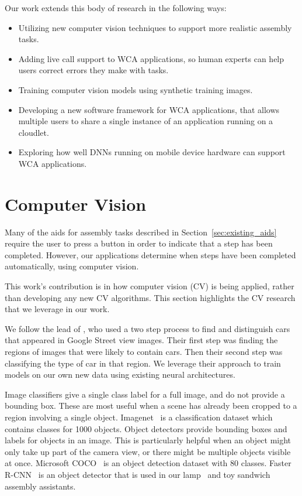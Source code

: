 Our work extends this body of research in the following ways:
\begin{itemize}
\item Utilizing new computer vision techniques to support more realistic
  assembly tasks.
\item Adding live call support to WCA applications, so human experts can help
  users correct errors they make with tasks.
\item Training computer vision models using synthetic training images.
\item Developing a new software framework for WCA applications, that allows
  multiple users to share a single instance of an application running on a
  cloudlet.
\item Exploring how well DNNs running on mobile device hardware can support
  WCA applications.
\end{itemize}

\section{Computer Vision}

Many of the aids for assembly tasks described in Section~\ref{sec:existing_aids}
require the user to press a button in order to indicate that a step has been
completed.
However, our applications determine when steps have been completed
automatically, using computer vision.

This work's contribution is in how computer vision (CV) is being applied, rather
than developing any new CV algorithms.
This section highlights the CV research that we leverage in our work.

We follow the lead of \citet{gebru2017finegrained}, who used a two step
process to find and distinguish cars that appeared in Google Street view
images.
Their first step was finding the
regions of images that were likely to contain cars. Then their second step was
classifying the type of car in that region.
We leverage their approach to train models on our own new
data using existing neural architectures.

Image classifiers give a single class label for a full image, and do not provide
a bounding box. These are most useful when a scene has already been cropped to a
region involving a single object. Imagenet~\cite{ImageNet_VSS09} is a
classification dataset which contains classes for 1000 objects. Object
detectors provide bounding boxes and labels for objects in an image. This is
particularly helpful
when an object might only take up part of the camera view, or there might be
multiple objects visible
at once. Microsoft COCO~\cite{coco} is an object detection dataset with 80
classes.
Faster R-CNN~\cite{frcnn} is an object detector that is used in our
lamp~\cite{lamp} and toy sandwich~\cite{sandwich} assembly assistants.

